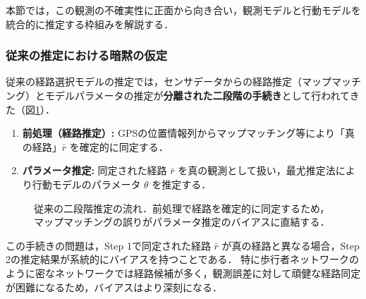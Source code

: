 本節では，この観測の不確実性に正面から向き合い，観測モデルと行動モデルを統合的に推定する枠組みを解説する．

\subsubsection{従来の推定における暗黙の仮定}\label{sssec:conventional_assumption}

従来の経路選択モデルの推定では，センサデータからの経路推定（マップマッチング）とモデルパラメータの推定が\textbf{分離された二段階の手続き}として行われてきた（図\ref{fig:estimation_bias}）．
\begin{enumerate}
  \item \textbf{前処理（経路推定）:} GPSの位置情報列からマップマッチング等により「真の経路」$\bar{r}$ を確定的に同定する．
  \item \textbf{パラメータ推定:} 同定された経路 $\bar{r}$ を真の観測として扱い，最尤推定法により行動モデルのパラメータ $\theta$ を推定する．
\end{enumerate}

\begin{figure}[htb]
  \centering
  \caption{従来の二段階推定の流れ．前処理で経路を確定的に同定するため，マップマッチングの誤りがパラメータ推定のバイアスに直結する．}
  \label{fig:estimation_bias}
\end{figure}

この手続きの問題は，Step 1で同定された経路 $\bar{r}$ が真の経路と異なる場合，Step 2の推定結果が系統的にバイアスを持つことである．
特に歩行者ネットワークのように密なネットワークでは経路候補が多く，観測誤差に対して頑健な経路同定が困難になるため，バイアスはより深刻になる．

